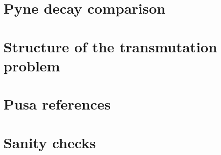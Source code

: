 \documentclass{article}
\begin{document}
\section{Pyne decay comparison}

\section{Structure of the transmutation problem}

\section{Pusa references}

\section{Sanity checks}


\end{document}
